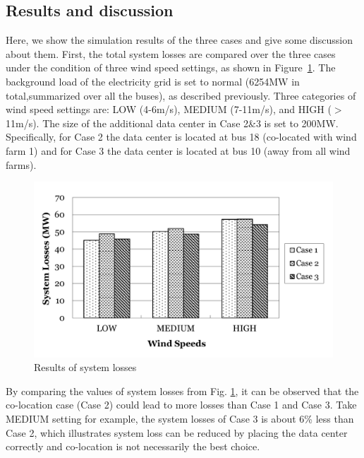 \subsection{Results and discussion}

Here, we show the simulation results of the three cases and give some discussion about them. First, the total system losses are compared over the three cases under the condition of three wind speed settings, as shown in Figure~\ref{fig:loss-cases}. The background load of the electricity grid is set to normal (6254MW in total,summarized over all the buses), as described previously. Three categories of wind speed settings are: LOW (4-6m/s), MEDIUM (7-11m/s), and HIGH ($>$11m/s). The size of the additional data center in Case 2\&3 is set to 200MW. Specifically, for Case 2 the data center is located at bus 18 (co-located with wind farm 1) and for Case 3 the data center is located at bus 10 (away from all wind farms).

\begin{figure}[ht]
\centering
\includegraphics[width=1\columnwidth]{img/loss3cases.pdf}
\caption{Results of system losses}
\label{fig:loss-cases}
\end{figure}

By comparing the values of system losses from Fig. \ref{fig:loss-cases}, it can be observed that the co-location case (Case 2) could lead to more losses than Case 1 and Case 3. Take MEDIUM setting for example, the system losses of Case 3 is about 6\% less than Case 2, which illustrates system loss can be reduced by placing the data center correctly and co-location is not necessarily the best choice.

